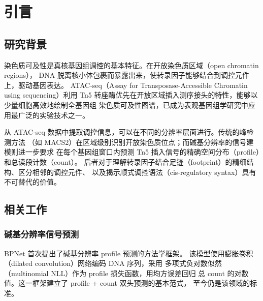 \documentclass[11pt,a4paper]{ctexart}
\begin{document}
\tableofcontents
\newpage

\section{引言}
\label{sec:intro}

\subsection{研究背景}
\label{sec:intro-bg}

染色质可及性是真核基因组调控的基本特征。在开放染色质区域（open chromatin regions），
DNA 脱离核小体包裹而暴露出来，使转录因子能够结合到调控元件上，驱动基因表达\cite{buenrostro2013transposition}。
ATAC-seq（Assay for Transposase-Accessible Chromatin using sequencing）利用
Tn5 转座酶优先在开放区域插入测序接头的特性，能够以少量细胞高效地绘制全基因组
染色质可及性图谱，已成为表观基因组学研究中应用最广泛的实验技术之一。

从 ATAC-seq 数据中提取调控信息，可以在不同的分辨率层面进行。传统的峰检测方法
（如 MACS2）在区域级别识别开放染色质位点；而碱基分辨率的信号建模则进一步要求
在每个基因组窗口内预测 Tn5 插入信号的精确空间分布（profile）和总读段计数（count）。
后者对于理解转录因子结合足迹（footprint）的精细结构、区分相邻的调控元件、
以及揭示顺式调控语法（cis-regulatory syntax）具有不可替代的价值。

\subsection{相关工作}
\label{sec:related}

\subsubsection{碱基分辨率信号预测}

BPNet\cite{avsec2021base} 首次提出了碱基分辨率 profile 预测的方法学框架。
该模型使用膨胀卷积（dilated convolution）网络编码 DNA 序列，采用
多项式负对数似然（multinomial NLL）作为 profile 损失函数，用均方误差回归
总 count 的对数值。这一框架建立了 profile + count 双头预测的基本范式，
至今仍是该领域的标准。
\end{document}
